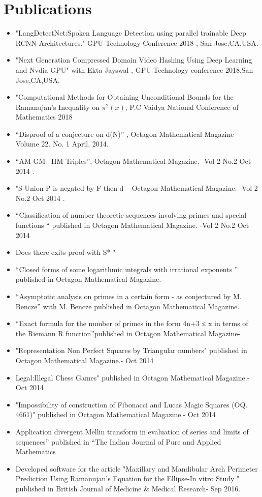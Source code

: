 \documentclass[]{deedy-resume-openfont}
\begin{document}
\section{Publications}
\hline
\vspace{\topsep}
\begin{itemize}
\item "LangDetectNet:Spoken Language Detection using parallel trainable Deep RCNN Architectures." GPU Technology Conference 2018 , San Jose,CA,USA.
\item "Next Generation Compressed Domain Video Hashing Using Deep Learning and Nvdia GPU" with Ekta Jayswal , GPU Technology conference 2018,San Jose,CA,USA.
\item "Computational Methods for Obtaining Unconditional Bounds for the Ramanujan’s Inequality on $\pi^2(x)$, P.C Vaidya National Conference of Mathematics 2018

\item “Disproof of a conjecture on d(N)” , Octagon Mathematical  Magazine  Volume 22. No. 1 April, 2014.
\item “AM-GM –HM Triples”, Octagon Mathematical Magazine. -Vol 2 No.2  Oct 2014 .
\item "S Union P is negated by F then d --  Octagon Mathematical Magazine. -Vol 2 No.2  Oct 2014 .
\item  “Classification of number theoretic sequences involving primes and special functions “ published in  Octagon Mathematical Magazine. -Vol 2 No.2  Oct 2014 
\item Does there exits proof with S* "
\item  “Closed forms of some logarithmic integrals with irrational exponents ”  published in Octagon Mathematical Magazine.- 
\item “Asymptotic analysis on primes in a certain form - as conjectured by M. Bencze” with M. Bencze  published in Octagon Mathematical Magazine.
\item “Exact formula for the number of primes in the form 4n+3 ≤ x in terms of the Riemann R function”published in Octagon Mathematical Magazine-
\item "Representation Non Perfect Squares by Triangular numbers" published in Octagon Mathematical Magazine.- Oct 2014
\item Legal:Illegal Chess Games"  published in Octagon Mathematical Magazine.- Oct 2014
\item 
"Impossibility of construction of Fibonacci and Lucas Magic Squares (OQ. 4661)" published in Octagon Mathematical Magazine.- Oct 2014
\item Application divergent Mellin transform in evaluation of series and limits of sequences”  published in “The Indian Journal of Pure and Applied Mathematics
\item Developed software for the article "Maxillary and Mandibular Arch Perimeter Prediction Using Ramanujan's Equation for the Ellipse-In vitro Study " published in  British Journal of Medicine & Medical Research- Sep 2016.
\end{itemize}
\sectionsep
\end{document}
